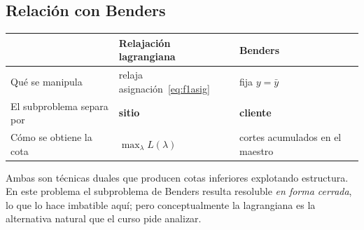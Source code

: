 \subsection{Relación con Benders}
\begin{center}
\begin{tabular}{lll}
\toprule
 & \textbf{Relajación lagrangiana} & \textbf{Benders} \\
\midrule
Qué se manipula & relaja asignación~\eqref{eq:f1asig} & fija $y=\bar y$ \\
El subproblema separa por & \textbf{sitio} & \textbf{cliente} \\
Cómo se obtiene la cota & $\max_\lambda L(\lambda)$ & cortes acumulados en el maestro \\
\bottomrule
\end{tabular}
\end{center}
Ambas son técnicas duales que producen cotas inferiores explotando estructura. En este problema
el subproblema de Benders resulta resoluble \emph{en forma cerrada}, lo que lo hace imbatible
aquí; pero conceptualmente la lagrangiana es la alternativa natural que el curso pide analizar.
